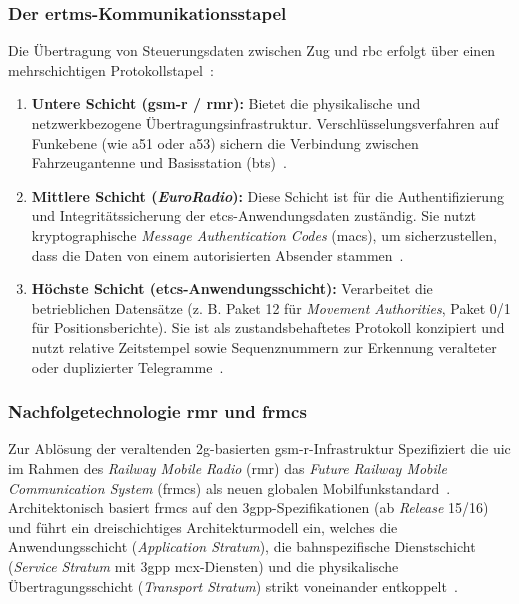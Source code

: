 \documentclass[runningheads]{res/llncs}
\begin{document}

\subsubsection{\texorpdfstring{Der \gls{ertms}-Kommunikationsstapel}{Der ERTMS-Kommunikationsstapel}}
\label{sec:Der_ERTMS-Kommunikationsstapel}
Die Übertragung von Steuerungsdaten zwischen Zug und \gls{rbc} erfolgt über einen mehrschichtigen Protokollstapel~\parencite[S. 744]{chothiaAttack2017}:

\begin{enumerate}
    \item \textbf{Untere Schicht (\gls{gsm-r} / \gls{rmr}):} Bietet die physikalische und netzwerkbezogene Übertragungsinfrastruktur. Verschlüsselungsverfahren auf Funkebene (wie \gls{a51} oder \gls{a53}) sichern die Verbindung zwischen Fahrzeugantenne und Basisstation (\gls{bts})~\parencite[S. 744, 750]{chothiaAttack2017}.
    \item \textbf{Mittlere Schicht (\textit{EuroRadio}):} Diese Schicht ist für die Authentifizierung und Integritätssicherung der \gls{etcs}-Anwendungsdaten zuständig. Sie nutzt kryptographische \textit{Message Authentication Codes} (\gls{mac}s), um sicherzustellen, dass die Daten von einem autorisierten Absender stammen~\parencite[S. 744, 751]{chothiaAttack2017}.
    \item \textbf{Höchste Schicht (\gls{etcs}-Anwendungsschicht):} Verarbeitet die betrieblichen Datensätze (z. B. Paket 12 für \textit{Movement Authorities}, Paket 0/1 für Positionsberichte). Sie ist als zustandsbehaftetes Protokoll konzipiert und nutzt relative Zeitstempel sowie Sequenznummern zur Erkennung veralteter oder duplizierter Telegramme~\parencite[S. 744, 754]{chothiaAttack2017}.
\end{enumerate}

\subsubsection{\texorpdfstring{Nachfolgetechnologie \gls{rmr} und \gls{frmcs}}{Nachfolgetechnologie RMR und FRMCS}}
\label{sec:Nachfolgetechnologie_RMR_und_FRMCS}
Zur Ablösung der veraltenden \gls{2g}-basierten \gls{gsm-r}-Infrastruktur Spezifiziert die \gls{uic} im Rahmen des \textit{Railway Mobile Radio} (\gls{rmr}) das \textit{Future Railway Mobile Communication System} (\gls{frmcs}) als neuen globalen Mobilfunkstandard~\parencite[S. 49, 123]{trinckaufETCS2024}. Architektonisch basiert \gls{frmcs} auf den \gls{3gpp}-Spezifikationen (ab \textit{Release} 15/16) und führt ein dreischichtiges Architekturmodell ein, welches die Anwendungsschicht (\textit{Application Stratum}), die bahnspezifische Dienstschicht (\textit{Service Stratum} mit \gls{3gpp} \gls{mcx}-Diensten) und die physikalische Übertragungsschicht (\textit{Transport Stratum}) strikt voneinander entkoppelt~\parencite[S. 123]{trinckaufETCS2024}. 
\end{document}
